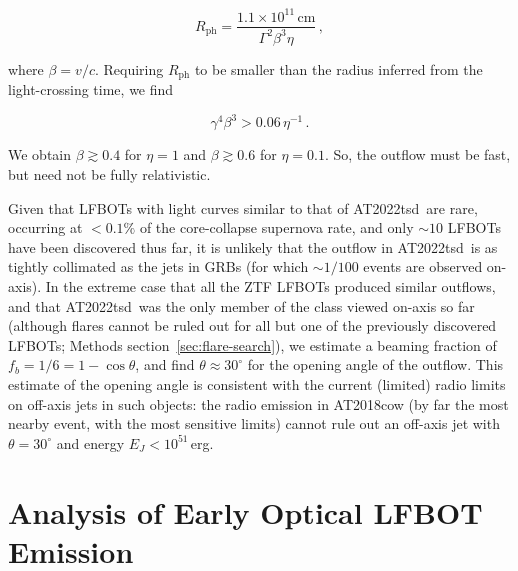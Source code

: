\documentclass{nature_plusfigure}
\newcommand{\at}{AT2022tsd}
\begin{document}
\begin{methods}
\begin{equation}
    R_\mathrm{ph} = \frac{1.1 \times 10^{11}\,\mathrm{cm}}{ \Gamma^2 \beta^3 \eta}\, ,
\end{equation}

\noindent where $\beta=v/c$. Requiring $R_\mathrm{ph}$ to be smaller than the radius inferred from the light-crossing time, we find

\begin{equation}
    \gamma^4 \beta^3 > 0.06\, \eta^{-1}\, .
\end{equation}

\noindent We obtain $\beta \gtrsim 0.4$ for $\eta=1$ and $\beta \gtrsim 0.6$ for $\eta=0.1$. So, the outflow must be fast, but need not be fully relativistic.

Given that LFBOTs with light curves similar to that of \at\ are rare, occurring at $<0.1\%$ of the core-collapse supernova rate\cite{Ho2023}, and only $\sim10$ LFBOTs have been discovered thus far, it is unlikely that the outflow in \at\ is as tightly collimated as the jets in GRBs (for which $\sim1/100$ events are observed on-axis).
In the extreme case that all the ZTF LFBOTs produced similar outflows, and that \at\ was the only member of the class viewed on-axis so far (although flares cannot be ruled out for all but one of the previously discovered LFBOTs; Methods section~\ref{sec:flare-search}), we estimate a beaming fraction of $f_b = 1/6 = 1-\cos{\theta}$, and find $\theta\approx30^{\circ}$ for the opening angle of the outflow. This estimate of the opening angle is consistent with the current (limited) radio limits on off-axis jets in such objects: the radio emission in AT2018cow (by far the most nearby event, with the most sensitive limits) cannot\cite{Margutti2019} rule out an off-axis jet with $\theta=30^{\circ}$ and energy $E_J<10^{51}\,$erg.%

\section{Analysis of Early Optical LFBOT Emission}
\label{sec:lfbot-lc-analysis}


\end{methods}
\end{document}
